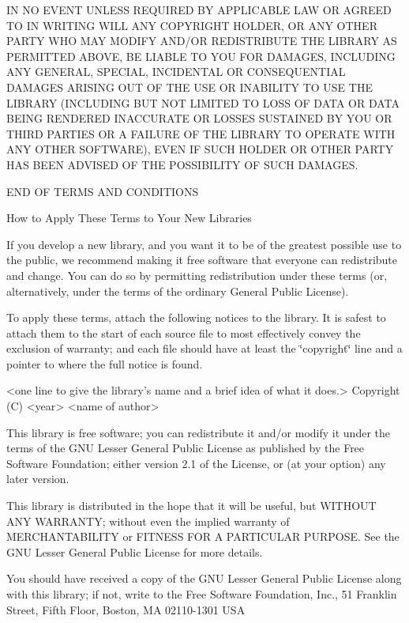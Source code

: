 \begin{DoxyEnumerate}
\item IN NO E\+V\+E\+NT U\+N\+L\+E\+SS R\+E\+Q\+U\+I\+R\+ED BY A\+P\+P\+L\+I\+C\+A\+B\+LE L\+AW OR A\+G\+R\+E\+ED TO IN W\+R\+I\+T\+I\+NG W\+I\+LL A\+NY C\+O\+P\+Y\+R\+I\+G\+HT H\+O\+L\+D\+ER, OR A\+NY O\+T\+H\+ER P\+A\+R\+TY W\+HO M\+AY M\+O\+D\+I\+FY A\+N\+D/\+OR R\+E\+D\+I\+S\+T\+R\+I\+B\+U\+TE T\+HE L\+I\+B\+R\+A\+RY AS P\+E\+R\+M\+I\+T\+T\+ED A\+B\+O\+VE, BE L\+I\+A\+B\+LE TO Y\+OU F\+OR D\+A\+M\+A\+G\+ES, I\+N\+C\+L\+U\+D\+I\+NG A\+NY G\+E\+N\+E\+R\+AL, S\+P\+E\+C\+I\+AL, I\+N\+C\+I\+D\+E\+N\+T\+AL OR C\+O\+N\+S\+E\+Q\+U\+E\+N\+T\+I\+AL D\+A\+M\+A\+G\+ES A\+R\+I\+S\+I\+NG O\+UT OF T\+HE U\+SE OR I\+N\+A\+B\+I\+L\+I\+TY TO U\+SE T\+HE L\+I\+B\+R\+A\+RY (I\+N\+C\+L\+U\+D\+I\+NG B\+UT N\+OT L\+I\+M\+I\+T\+ED TO L\+O\+SS OF D\+A\+TA OR D\+A\+TA B\+E\+I\+NG R\+E\+N\+D\+E\+R\+ED I\+N\+A\+C\+C\+U\+R\+A\+TE OR L\+O\+S\+S\+ES S\+U\+S\+T\+A\+I\+N\+ED BY Y\+OU OR T\+H\+I\+RD P\+A\+R\+T\+I\+ES OR A F\+A\+I\+L\+U\+RE OF T\+HE L\+I\+B\+R\+A\+RY TO O\+P\+E\+R\+A\+TE W\+I\+TH A\+NY O\+T\+H\+ER S\+O\+F\+T\+W\+A\+RE), E\+V\+EN IF S\+U\+CH H\+O\+L\+D\+ER OR O\+T\+H\+ER P\+A\+R\+TY H\+AS B\+E\+EN A\+D\+V\+I\+S\+ED OF T\+HE P\+O\+S\+S\+I\+B\+I\+L\+I\+TY OF S\+U\+CH D\+A\+M\+A\+G\+ES. \begin{DoxyVerb}                 END OF TERMS AND CONDITIONS

       How to Apply These Terms to Your New Libraries
\end{DoxyVerb}

\end{DoxyEnumerate}

If you develop a new library, and you want it to be of the greatest possible use to the public, we recommend making it free software that everyone can redistribute and change. You can do so by permitting redistribution under these terms (or, alternatively, under the terms of the ordinary General Public License).

To apply these terms, attach the following notices to the library. It is safest to attach them to the start of each source file to most effectively convey the exclusion of warranty; and each file should have at least the \char`\"{}copyright\char`\"{} line and a pointer to where the full notice is found. \begin{DoxyVerb}<one line to give the library's name and a brief idea of what it does.>
Copyright (C) <year>  <name of author>

This library is free software; you can redistribute it and/or
modify it under the terms of the GNU Lesser General Public
License as published by the Free Software Foundation; either
version 2.1 of the License, or (at your option) any later version.

This library is distributed in the hope that it will be useful,
but WITHOUT ANY WARRANTY; without even the implied warranty of
MERCHANTABILITY or FITNESS FOR A PARTICULAR PURPOSE.  See the GNU
Lesser General Public License for more details.

You should have received a copy of the GNU Lesser General Public
License along with this library; if not, write to the Free Software
Foundation, Inc., 51 Franklin Street, Fifth Floor, Boston, MA  02110-1301
USA
\end{DoxyVerb}


